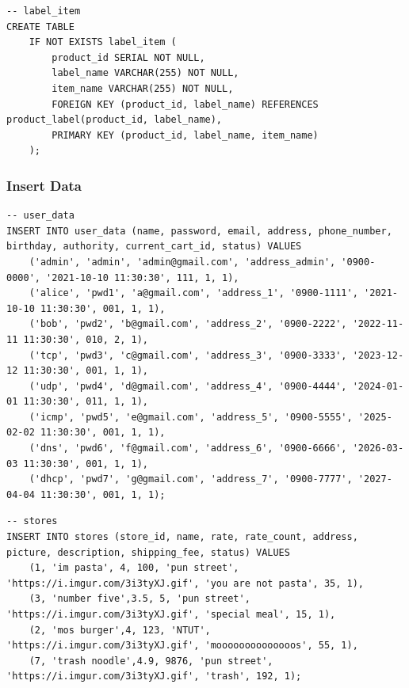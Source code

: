 \documentclass[a4paper, 12pt]{article}
\begin{document}
\begin{lstlisting}
-- label_item
CREATE TABLE
    IF NOT EXISTS label_item (
        product_id SERIAL NOT NULL,
        label_name VARCHAR(255) NOT NULL,
        item_name VARCHAR(255) NOT NULL,
        FOREIGN KEY (product_id, label_name) REFERENCES product_label(product_id, label_name),
        PRIMARY KEY (product_id, label_name, item_name)
    );
\end{lstlisting}

\subsubsection{Insert Data}

\begin{lstlisting}
-- user_data
INSERT INTO user_data (name, password, email, address, phone_number, birthday, authority, current_cart_id, status) VALUES
    ('admin', 'admin', 'admin@gmail.com', 'address_admin', '0900-0000', '2021-10-10 11:30:30', 111, 1, 1),
    ('alice', 'pwd1', 'a@gmail.com', 'address_1', '0900-1111', '2021-10-10 11:30:30', 001, 1, 1),
    ('bob', 'pwd2', 'b@gmail.com', 'address_2', '0900-2222', '2022-11-11 11:30:30', 010, 2, 1),
    ('tcp', 'pwd3', 'c@gmail.com', 'address_3', '0900-3333', '2023-12-12 11:30:30', 001, 1, 1),
    ('udp', 'pwd4', 'd@gmail.com', 'address_4', '0900-4444', '2024-01-01 11:30:30', 011, 1, 1),
    ('icmp', 'pwd5', 'e@gmail.com', 'address_5', '0900-5555', '2025-02-02 11:30:30', 001, 1, 1),
    ('dns', 'pwd6', 'f@gmail.com', 'address_6', '0900-6666', '2026-03-03 11:30:30', 001, 1, 1),
    ('dhcp', 'pwd7', 'g@gmail.com', 'address_7', '0900-7777', '2027-04-04 11:30:30', 001, 1, 1);
\end{lstlisting}

\begin{lstlisting}
-- stores
INSERT INTO stores (store_id, name, rate, rate_count, address, picture, description, shipping_fee, status) VALUES 
    (1, 'im pasta', 4, 100, 'pun street', 'https://i.imgur.com/3i3tyXJ.gif', 'you are not pasta', 35, 1),
    (3, 'number five',3.5, 5, 'pun street', 'https://i.imgur.com/3i3tyXJ.gif', 'special meal', 15, 1),
    (2, 'mos burger',4, 123, 'NTUT', 'https://i.imgur.com/3i3tyXJ.gif', 'moooooooooooooos', 55, 1),
    (7, 'trash noodle',4.9, 9876, 'pun street', 'https://i.imgur.com/3i3tyXJ.gif', 'trash', 192, 1);
\end{lstlisting}
\end{document}

